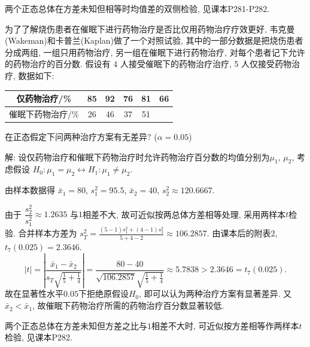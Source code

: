 \documentclass[standard]{ExBook}
\renewenvironment{shaded}{%
  \def\FrameCommand{\fboxsep=\FrameSep \colorbox{shadecolor}}%
  \MakeFramed{\advance\hsize-\width \FrameRestore}%
}{%
  \endMakeFramed
}
\begin{document}
\begin{qitems}
\textcolor{themeColor}{\selectfont {} 两个正态总体在方差未知但相等时均值差的双侧检验, 见课本P281-P282.}

\vspace{2.5cm-5em}

    \begin{bbox}
    \begin{shaded}
        \qitem
为了了解烧伤患者在催眠下进行药物治疗是否比仅用药物治疗疗效更好, 韦克曼(Wakeman)和卡普兰(Kaplan)做了一个对照试验, 其中的一部分数据是把烧伤患者分成两组, 一组只用药物治疗, 另一组在催眠下进行药物治疗, 对每个患者记下允许的药物治疗的百分数. 假设有 4 人接受催眠下的药物治疗治疗, 5 人仅接受药物治疗, 数据如下:
\begin{center}
\setlength{\tabcolsep}{26pt}
\begin{tabular}{c|ccccc}
\hline
仅药物治疗/\% & 85 & 92 & 76 & 81 & 66 \\
\hline
催眠下药物治疗/\% & 26 & 46 & 37 & 51 & \\
\hline
\end{tabular}
\end{center}
在正态假定下问两种治疗方案有无差异? ($\alpha = 0.05$)
    \end{shaded}
    \end{bbox}

\vspace{\dimexpr2.5cm-5em\relax}

解: 设仅药物治疗和催眠下药物治疗时允许药物治疗百分数的均值分别为$\mu_1$, $\mu_2$, 考虑假设
$
H_0:\mu_1=\mu_2
\longleftrightarrow
H_1:\mu_1\neq\mu_2
$.

由样本数据得
$
\bar{x}_1=80
$,
$
s_1^2=95.5
$,
$
\bar{x}_2=40
$,
$
s_2^2\approx120.6667
$.

由于
$
\dfrac{s_2^2}{s_1^2}
\approx1.2635
$
与$1$相差不大, 故可近似按两总体方差相等处理, 采用两样本$t$检验. 合并样本方差为
$
s_T^2
=\frac{(5-1)s_1^2+(4-1)s_2^2}{5+4-2}
\approx106.2857
$.
由课本后的附表2, $t_7(0.025)=2.3646$.
$$
|t|
=
\left|
\frac{\bar{x}_1-\bar{x}_2}
{s_T\sqrt{\frac{1}{5}+\frac{1}{4}}}
\right|
=
\frac{80-40}
{\sqrt{106.2857}\sqrt{\frac{1}{5}+\frac{1}{4}}}
\approx5.7838
>
2.3646
=
t_7(0.025).
$$
故在显著性水平$0.05$下拒绝原假设$H_0$, 即可以认为两种治疗方案有显著差异. 又$\bar{x}_2<\bar{x}_1$, 故催眠下药物治疗所需的药物治疗百分数显著较低.

\textcolor{themeColor}{\selectfont {} 两个正态总体在方差未知但方差之比与$1$相差不大时, 可近似按方差相等作两样本$t$检验, 见课本P282.}

\vspace{1em}


\end{qitems}
\end{document}
